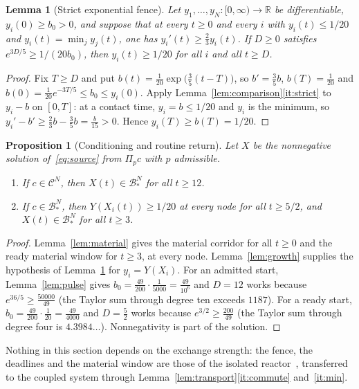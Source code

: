 \documentclass[11pt,a4paper]{article}
\theoremstyle{plain}
\newtheorem{proposition}[theorem]{Proposition}
\newtheorem{lemma}[theorem]{Lemma}
\theoremstyle{definition}
\theoremstyle{remark}
\newcommand{\R}{\mathbb R}
\newcommand{\Adm}{\mathcal C}
\newcommand{\Bstar}{\mathcal B_*}
\newcommand{\Pulse}{\Pi}
\begin{document}
\begin{lemma}[Strict exponential fence]\label{lem:fence}
Let $y_1,\dots,y_N:[0,\infty)\to\R$ be differentiable, $y_i(0)\ge b_0>0$, and suppose that at every $t\ge0$ and every $i$ with $y_i(t)\le1/20$ and $y_i(t)=\min_jy_j(t)$, one has $y_i'(t)\ge\frac23y_i(t)$. If $D\ge0$ satisfies $e^{3D/5}\ge1/(20b_0)$, then $y_i(t)\ge1/20$ for all $i$ and all $t\ge D$.
\end{lemma}
\begin{proof}
Fix $T\ge D$ and put $b(t)=\frac1{20}\exp\bigl(\frac35(t-T)\bigr)$, so $b'=\frac35b$, $b(T)=\frac1{20}$ and $b(0)=\frac1{20}e^{-3T/5}\le b_0\le y_i(0)$. Apply Lemma~\ref{lem:comparison}\ref{it:strict} to $y_i-b$ on $[0,T]$: at a contact time, $y_i=b\le1/20$ and $y_i$ is the minimum, so $y_i'-b'\ge\frac23b-\frac35b=\frac b{15}>0$. Hence $y_i(T)\ge b(T)=1/20$.
\end{proof}

\begin{proposition}[Conditioning and routine return]\label{prop:return}
Let $X$ be the nonnegative solution of~\eqref{eq:source} from $\Pulse_pc$ with $p$ admissible.
\begin{enumerate}[label=(\roman*)]
\item If $c\in\Adm^N$, then $X(t)\in\Bstar^N$ for all $t\ge12$.
\item If $c\in\Bstar^N$, then $Y(X_i(t))\ge1/20$ at every node for all $t\ge5/2$, and $X(t)\in\Bstar^N$ for all $t\ge3$.
\end{enumerate}
\end{proposition}
\begin{proof}
Lemma~\ref{lem:material} gives the material corridor for all $t\ge0$ and the ready material window for $t\ge3$, at every node. Lemma~\ref{lem:growth} supplies the hypothesis of Lemma~\ref{lem:fence} for $y_i=Y(X_i)$. For an admitted start, Lemma~\ref{lem:pulse} gives $b_0=\frac{49}{200}\cdot\frac1{5000}=\frac{49}{10^6}$ and $D=12$ works because $e^{36/5}\ge\frac{50000}{49}$ (the Taylor sum through degree ten exceeds $1187$). For a ready start, $b_0=\frac{49}{200}\cdot\frac1{20}=\frac{49}{4000}$ and $D=\frac52$ works because $e^{3/2}\ge\frac{200}{49}$ (the Taylor sum through degree four is $4.3984\ldots$). Nonnegativity is part of the solution.
\end{proof}
Nothing in this section depends on the exchange strength: the fence, the deadlines and the material window are those of the isolated reactor~\citep[Lemma~5.1, Proposition~5.2]{recovery2026}, transferred to the coupled system through Lemma~\ref{lem:transport}\ref{it:commute} and~\ref{it:min}.
\end{document}
